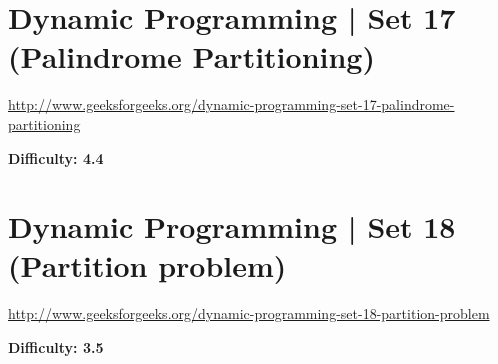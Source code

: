 \RayNotesBegin



\RayNotesEnd

\textbf{}



\section{Dynamic Programming | Set 17 (Palindrome Partitioning)
  \label{secGFGDPSet17PalinPartitioning}}

\url{http://www.geeksforgeeks.org/dynamic-programming-set-17-palindrome-partitioning}

\textbf{Difficulty: 4.4}

\textbf{}

\RayNotesBegin



\RayNotesEnd

\textbf{}



\section{Dynamic Programming | Set 18 (Partition problem)
  \label{secGFGDPSet18PartitionProb}}

\url{http://www.geeksforgeeks.org/dynamic-programming-set-18-partition-problem}

\textbf{Difficulty: 3.5}


\textbf{}

\RayNotesBegin



\RayNotesEnd

\textbf{}



